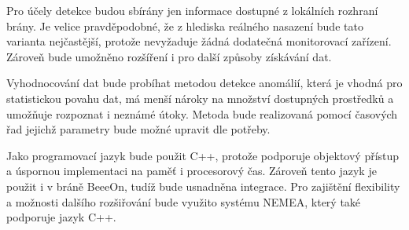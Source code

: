  Pro účely detekce budou sbírány jen informace dostupné z lokálních rozhraní brány.
 Je velice pravděpodobné, že z hlediska reálného nasazení bude tato varianta nejčastější, 
 protože nevyžaduje žádná dodatečná monitorovací zařízení.
 Zároveň bude umožněno rozšíření i pro další
 způsoby získávání dat. 
 
 Vyhodnocování dat bude probíhat metodou detekce anomálií, která je vhodná pro statistickou povahu dat,
 má menší nároky na množství dostupných prostředků a umožňuje rozpoznat i neznámé útoky. Metoda 
 bude realizovaná pomocí časových řad jejichž parametry bude možné upravit dle potřeby.
 
 Jako programovací jazyk bude použit C++, protože podporuje objektový přístup a
 úspornou implementaci na paměť i procesorový čas. Zároveň tento jazyk je použit i v bráně
 BeeeOn, tudíž bude usnadněna integrace. Pro zajištění flexibility a možnosti dalšího rozšiřování 
 bude využito systému NEMEA, který také podporuje jazyk C++. 

